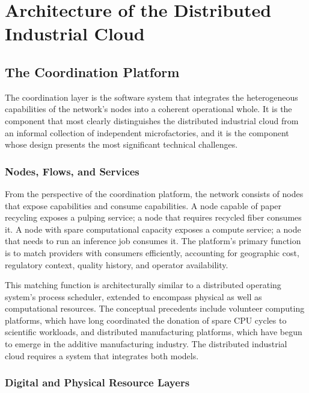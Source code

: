 \documentclass[12pt]{book}
\theoremstyle{definition}
\theoremstyle{remark}
\begin{document}
\part{Architecture of the Distributed Industrial Cloud}

\chapter{The Coordination Platform}

The coordination layer is the software system that integrates the
heterogeneous capabilities of the network's nodes into a coherent
operational whole. It is the component that most clearly
distinguishes the distributed industrial cloud from an informal
collection of independent microfactories, and it is the component
whose design presents the most significant technical challenges.

\section{Nodes, Flows, and Services}

From the perspective of the coordination platform, the network
consists of nodes that expose capabilities and consume capabilities.
A node capable of paper recycling exposes a pulping service; a node
that requires recycled fiber consumes it. A node with spare
computational capacity exposes a compute service; a node that needs
to run an inference job consumes it. The platform's primary function
is to match providers with consumers efficiently, accounting for
geographic cost, regulatory context, quality history, and operator
availability.

This matching function is architecturally similar to a distributed
operating system's process scheduler, extended to encompass physical
as well as computational resources. The conceptual precedents include
volunteer computing platforms, which have long coordinated the
donation of spare CPU cycles to scientific workloads, and distributed
manufacturing platforms, which have begun to emerge in the additive
manufacturing industry. The distributed industrial cloud requires a
system that integrates both models.

\section{Digital and Physical Resource Layers}
\end{document}
